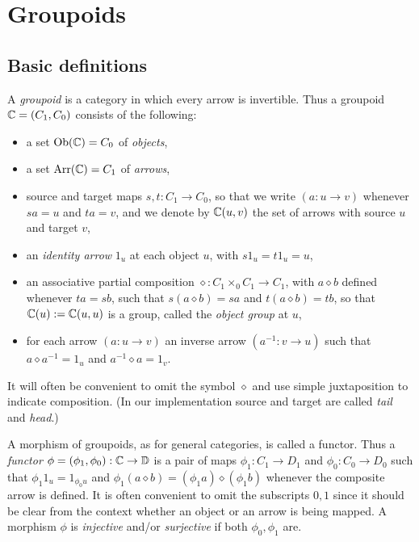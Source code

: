
\section{Groupoids} \label{sec:gpds}


\subsection{Basic definitions} \label{subsect:gpd-defs}
  

A \emph{groupoid} is a category in which every arrow is invertible. 
Thus a groupoid $\mathbb{C} = (C_1,C_0)$ consists of the following: 
\begin{itemize}
\item
a set $\mathrm{Ob}(\mathbb{C}) = C_0$ of \emph{objects}, 
\item 
a set $\mathrm{Arr}(\mathbb{C}) = C_1$ of \emph{arrows}, 
\item
source and target maps $s,t : C_1 \to C_0$, so that we write 
$(a:u \to v)$ whenever $sa=u$ and $ta=v$, 
and we denote by $\mathbb{C}(u,v)$ the set of arrows with source $u$ and target $v$, 
\item 
an \emph{identity arrow} $1_u$ at each object $u$, with $s1_u=t1_u=u$, 
\item 
an associative  partial composition $\diamond: C_1 \times_0 C_1 \to C_1$, 
with $a \diamond b$ defined whenever $ta=sb$, such that 
$s(a \diamond b) = sa$ and $t(a \diamond b) = tb$, 
so that $\mathbb{C}(u):=\mathbb{C}(u,u)$ is a group, 
called the \emph{object group} at $u$,   
\item 
for each arrow $(a : u \to v)$ an inverse arrow $(a^{-1} : v \to u)$ 
such that $a \diamond a^{-1} = 1_u$ and $a^{-1} \diamond a = 1_v$. 
\end{itemize}
It will often be convenient to omit the symbol $\diamond$ and use simple 
juxtaposition to indicate composition. 
(In our {\GAP} implementation source and target are called 
\emph{tail} and \emph{head}.) 

A morphism of groupoids, as for general categories, is called a functor. 
  
Thus a \emph{functor} $\phi = (\phi_1,\phi_0) : \mathbb{C} \to \mathbb{D}$
is a pair of maps $\phi_1 : C_1 \to D_1$ and $\phi_0 : C_0 \to D_0$ 
such that $\phi_1 1_u = 1_{\phi_0 u}$ and 
$\phi_1(a \diamond b) = (\phi_1a)\diamond(\phi_1b)$ 
whenever the composite arrow is defined. 
It is often convenient to omit the subscripts $0,1$ since it should be clear 
from the context whether an object or an arrow is being mapped. 
A morphism $\phi$ is \emph{injective} and/or \emph{surjective} 
if both $\phi_0,\phi_1$ are. 

